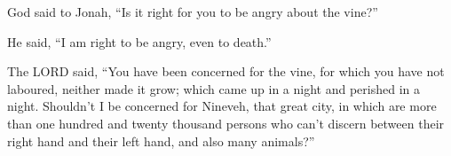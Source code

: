 God said to Jonah, ``Is it right for you to be angry about
the vine?''

He said, ``I am right to be angry, even to death.''

 The LORD said, ``You have been concerned for the vine, for
which you have not laboured, neither made it grow; which came up in a
night and perished in a night.  Shouldn't I be concerned
for Nineveh, that great city, in which are more than one hundred and
twenty thousand persons who can't discern between their right hand and
their left hand, and also many animals?''
